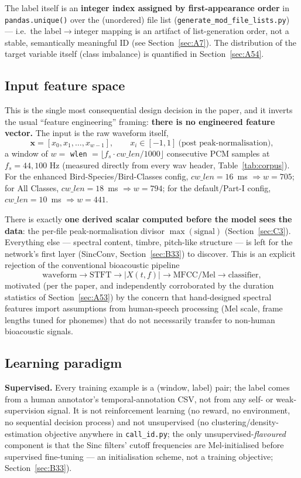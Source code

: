 \documentclass[11pt]{article}
\begin{document}
The label itself is an \textbf{integer index assigned by first-appearance
order} in \texttt{pandas.unique()} over the (unordered) file list
(\texttt{generate\_mod\_file\_lists.py}) --- i.e.\ the label$\to$integer
mapping is an artifact of list-generation order, not a stable, semantically
meaningful ID (see Section~\ref{sec:A7}). The distribution of the target
variable itself (class imbalance) is quantified in Section~\ref{sec:A54}.

\subsection{Input feature space}
\label{sec:A3}

This is the single most consequential design decision in the paper, and it
inverts the usual ``feature engineering'' framing: \textbf{there is no
engineered feature vector.} The input is the raw waveform itself,
\[
\mathbf{x} = [x_0, x_1, \dots, x_{w-1}], \qquad x_i \in [-1,1]\ \text{(post peak-normalisation)},
\]
a window of $w=$ \texttt{wlen} $=\lfloor f_s \cdot cw\_len / 1000\rfloor$
consecutive PCM samples at $f_s = 44{,}100$ Hz (measured directly from every
wav header, Table~\ref{tab:corpus}). For the enhanced Bird-Species/Bird-Classes
config, $cw\_len=16$~ms $\Rightarrow w=705$; for All Classes, $cw\_len=18$~ms
$\Rightarrow w=794$; for the default/Part-I config, $cw\_len=10$~ms
$\Rightarrow w=441$.

There is exactly \textbf{one derived scalar computed before the model sees
the data}: the per-file peak-normalisation divisor $\max(\text{signal})$
(Section~\ref{sec:C3}). Everything else --- spectral content, timbre,
pitch-like structure --- is left for the network's first layer (SincConv,
Section~\ref{sec:B33}) to discover. This is an explicit rejection of the
conventional bioacoustic pipeline
\[
\text{waveform} \to \text{STFT} \to |X(t,f)| \to \text{MFCC/Mel} \to \text{classifier},
\]
motivated (per the paper, and independently corroborated by the duration
statistics of Section~\ref{sec:A53}) by the concern that hand-designed
spectral features import assumptions from human-speech processing (Mel
scale, frame lengths tuned for phonemes) that do not necessarily transfer to
non-human bioacoustic signals.

\subsection{Learning paradigm}
\label{sec:A4}

\textbf{Supervised.} Every training example is a (window, label) pair; the
label comes from a human annotator's temporal-annotation CSV, not from any
self- or weak-supervision signal. It is not reinforcement learning (no
reward, no environment, no sequential decision process) and not unsupervised
(no clustering/density-estimation objective anywhere in \texttt{call\_id.py};
the only unsupervised-\emph{flavoured} component is that the Sinc filters'
cutoff frequencies are Mel-initialised before supervised fine-tuning --- an
initialisation scheme, not a training objective; Section~\ref{sec:B33}).
\end{document}
